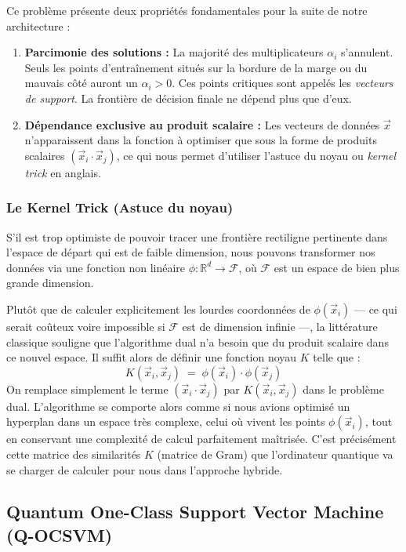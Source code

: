 \documentclass[a4paper]{article}
\begin{document}
Ce problème présente deux propriétés fondamentales pour la suite de notre architecture :
\begin{enumerate}
    \item \textbf{Parcimonie des solutions :} La majorité des multiplicateurs $\alpha_i$ s'annulent. Seuls les points d'entraînement situés sur la bordure de la marge ou du mauvais côté auront un $\alpha_i > 0$. Ces points critiques sont appelés les \emph{vecteurs de support}. La frontière de décision finale ne dépend plus que d'eux.
    \item \textbf{Dépendance exclusive au produit scalaire :} Les vecteurs de données $\vec{x}$ n'apparaissent dans la fonction à optimiser que sous la forme de produits scalaires $(\vec{x}_i \cdot \vec{x}_j)$, ce qui nous permet d'utiliser l'astuce du noyau ou \emph{kernel trick} en anglais.
\end{enumerate}

\subsubsection*{Le Kernel Trick (Astuce du noyau)}

S'il est trop optimiste de pouvoir tracer une frontière rectiligne pertinente dans l'espace de départ qui est de faible dimension, nous pouvons transformer nos données via une fonction non linéaire $\phi : \mathbb{R}^d \rightarrow \mathcal{F}$, où $\mathcal{F}$ est un espace de bien plus grande dimension. 

Plutôt que de calculer explicitement les lourdes coordonnées de $\phi(\vec{x}_i)$ — ce qui serait coûteux voire impossible si $\mathcal{F}$ est de dimension infinie —, la littérature classique \cite{boser1992kernel} souligne que l'algorithme dual n'a besoin que du produit scalaire dans ce nouvel espace. Il suffit alors de définir une fonction noyau $K$ telle que :
\[
K(\vec{x}_i, \vec{x}_j) \;=\; \phi(\vec{x}_i) \cdot \phi(\vec{x}_j)
\]
On remplace simplement le terme $(\vec{x}_i \cdot \vec{x}_j)$ par $K(\vec{x}_i, \vec{x}_j)$ dans le problème dual. L'algorithme se comporte alors comme si nous avions optimisé un hyperplan dans un espace très complexe, celui où vivent les points $\phi(\vec{x}_i)$, tout en conservant une complexité de calcul parfaitement maîtrisée. C'est précisément cette matrice des similarités $K$ (matrice de Gram) que l'ordinateur quantique va se charger de calculer pour nous dans l'approche hybride.

\subsection{Quantum One-Class Support Vector Machine (Q-OCSVM)}
\label{subsec:q-ocsvm}
\end{document}
